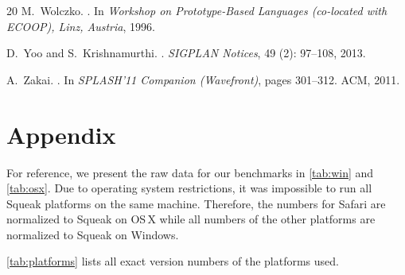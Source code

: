 \documentclass[natbib]{sigplanconf}
\begin{document}
{\begin{thebibliography}{20}
M.~Wolczko.
.
\newblock In \emph{Workshop on Prototype-Based Languages (co-located with
  ECOOP), Linz, Austria}, 1996.

D.~Yoo and S.~Krishnamurthi.
.
\newblock \emph{SIGPLAN Notices}, 49 (2): 97--108, 2013.

A.~Zakai.
.
\newblock In \emph{SPLASH'11 Companion (Wavefront)}, pages 301--312. ACM, 2011.

\end{thebibliography}

}

\clearpage
\appendix
\null

\section*{Appendix}
\label{sec:appendix}
\begingroup
\renewcommand*\thetable{\Alph{table}}
\setcounter{table}{0}
\itshape

For reference, we present the raw data for our benchmarks in
\autoref{tab:win} and \autoref{tab:osx}. Due to operating system
restrictions, it was impossible to run all Squeak platforms on the
same machine. Therefore, the numbers for Safari are normalized to
Squeak on OS\,X while all numbers of the other platforms are
normalized to Squeak on Windows.

\autoref{tab:platforms} lists all exact version numbers of the
platforms used.
\end{document}
